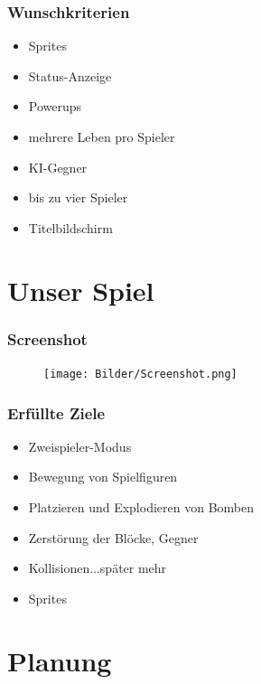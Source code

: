 \documentclass[18pt]{beamer}
\begin{document}
		\begin{frame}
			\frametitle{Wunschkriterien}
				\begin{itemize}
					\item Sprites
					\item Status-Anzeige
					\item Powerups
					\item mehrere Leben pro Spieler
					\item KI-Gegner
					\item bis zu vier Spieler
					\item Titelbildschirm
				\end{itemize}
		\end{frame}
	
\section{Unser Spiel}
	\begin{frame}
		\frametitle{Screenshot}
		\begin{figure}[H]
			\centering
			\texttt{[image: Bilder/Screenshot.png]}
			\centering
		\end{figure}
	\end{frame}

	\begin{frame}
		\frametitle{Erfüllte Ziele}
		\begin{itemize}
			\item Zweispieler-Modus
			\item Bewegung von Spielfiguren
			\item Platzieren und Explodieren von Bomben
			\item Zerstörung der Blöcke, Gegner
			\item Kollisionen...später mehr
			\item Sprites
		\end{itemize}
	\end{frame}
	
	
\section{Planung}
\end{document}

